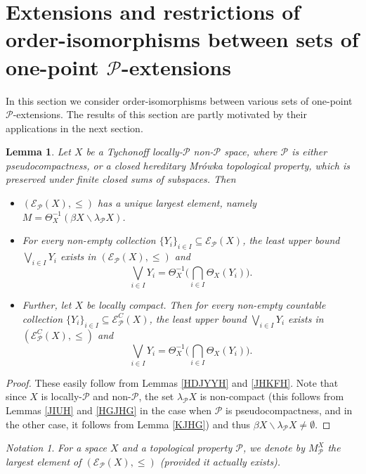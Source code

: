 \documentclass{amsart}
\newtheorem{lemma}[theorem]{Lemma}
\theoremstyle{definition}
\theoremstyle{remark}
\theoremstyle{notation}
\newtheorem{notation}[theorem]{Notation}
\numberwithin{equation}{section}
\begin{document}
\section{Extensions and restrictions of order-isomorphisms between  sets of one-point ${\mathcal P}$-extensions}

In this section we consider order-isomorphisms between various sets of one-point ${\mathcal P}$-extensions. The results of this section are partly motivated by their applications in the next section.

\begin{lemma}\label{KJGT}
Let $X$ be a Tychonoff locally-${\mathcal P}$ non-${\mathcal P}$  space,  where  ${\mathcal P}$ is either pseudocompactness, or a
closed hereditary Mr\'{o}wka topological property, which is preserved under  finite closed sums of subspaces. Then
\begin{itemize}
\item[\rm(1)] $({\mathscr E}_{{\mathcal P}}(X),\leq)$ has a unique largest element, namely $M=\Theta_X^{-1}(\beta X\backslash\lambda_{{\mathcal P}} X)$.
\item[\rm(2)] For every non-empty collection $\{Y_i\}_{i\in I}\subseteq{\mathscr E}_{{\mathcal P}}(X)$, the least upper bound $\bigvee_{i\in I}Y_i$ exists in $({\mathscr E}_{{\mathcal P}}(X),\leq)$ and
    \[\bigvee_{i\in I}Y_i=\Theta_X^{-1}\Big(\bigcap_{i\in I}\Theta_X(Y_i)\Big).\]
\item[\rm(3)] Further, let $X$ be locally compact. Then for every non-empty countable collection $\{Y_i\}_{i\in I}\subseteq{\mathscr E}^C_{{\mathcal P}}(X)$, the least upper bound $\bigvee_{i\in I}Y_i$ exists in $({\mathscr E}^C_{{\mathcal P}}(X),\leq)$ and
    \[\bigvee_{i\in I}Y_i=\Theta_X^{-1}\Big(\bigcap_{i\in I}\Theta_X(Y_i)\Big).\]
\end{itemize}
\end{lemma}

\begin{proof}
These  easily follow from Lemmas  \ref{HDJYYH} and  \ref{JHKFH}. Note that since $X$ is locally-${\mathcal P}$ and non-${\mathcal P}$, the set $\lambda_{{\mathcal P}} X$
is non-compact (this follows from Lemmas \ref{JIUH}
and \ref{HGJHG} in the case  when  ${\mathcal P}$ is pseudocompactness, and in the other case, it follows from Lemma \ref{KJHG}) and thus
$\beta X\backslash\lambda_{{\mathcal P}} X\neq\emptyset$.
\end{proof}

\begin{notation}\label{HGTTDR}
{\em For a   space $X$  and a topological property ${\mathcal P}$, we denote by $M^X_{{\mathcal P}}$ the largest element of
$({\mathscr E}_{{\mathcal P}}(X),\leq)$ (provided it actually exists).}
\end{notation}
\end{document}
